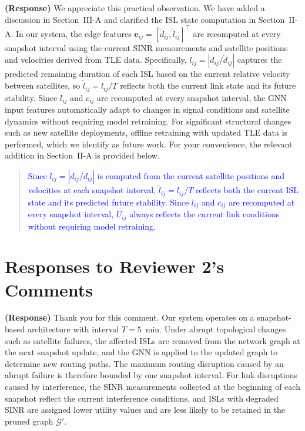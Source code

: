 \documentclass[letter]{article}
\begin{document}
\vspace{5mm}
{\bf (Response)}
We appreciate this practical observation. We have added a discussion in Section~III-A and clarified the ISL state computation in Section~II-A. In our system, the edge features $\mathbf{e}_{ij} = [\tilde{d}_{ij}, \tilde{l}_{ij}]^\top$ are recomputed at every snapshot interval using the current SINR measurements and satellite positions and velocities derived from TLE data. Specifically, $l_{ij} = |d_{ij}/\dot{d}_{ij}|$ captures the predicted remaining duration of each ISL based on the current relative velocity between satellites, so $\tilde{l}_{ij} = l_{ij}/T$ reflects both the current link state and its future stability. Since $l_{ij}$ and $c_{ij}$ are recomputed at every snapshot interval, the GNN input features automatically adapt to changes in signal conditions and satellite dynamics without requiring model retraining. For significant structural changes such as new satellite deployments, offline retraining with updated TLE data is performed, which we identify as future work. For your convenience, the relevant addition in Section~II-A is provided below.

\begin{quote}
\textcolor{blue}{Since $l_{ij} = |d_{ij}/\dot{d}_{ij}|$ is computed from the current satellite positions and velocities at each snapshot interval, $\tilde{l}_{ij} = l_{ij}/T$ reflects both the current ISL state and its predicted future stability. Since $l_{ij}$ and $c_{ij}$ are recomputed at every snapshot interval, $U_{ij}$ always reflects the current link conditions without requiring model retraining.}
\end{quote}

\newpage
\vspace{0.1cm} \noindent
\section*{\large Responses to Reviewer 2's Comments}

\noindent {}

\vspace{5mm}
{\bf (Response)}
Thank you for this comment. Our system operates on a snapshot-based architecture with interval $T = 5$~min. Under abrupt topological changes such as satellite failures, the affected ISLs are removed from the network graph at the next snapshot update, and the GNN is applied to the updated graph to determine new routing paths. The maximum routing disruption caused by an abrupt failure is therefore bounded by one snapshot interval. For link disruptions caused by interference, the SINR measurements collected at the beginning of each snapshot reflect the current interference conditions, and ISLs with degraded SINR are assigned lower utility values and are less likely to be retained in the pruned graph $\mathcal{G}'$.
\end{document}
